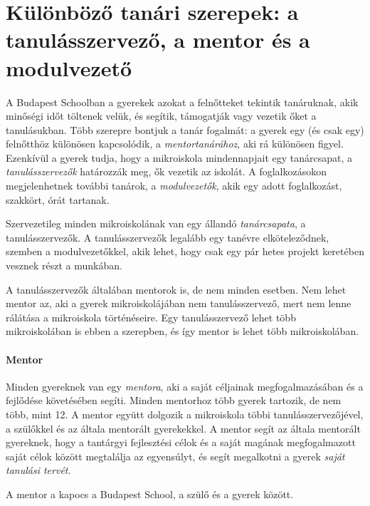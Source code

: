 \section{Különböző tanári szerepek: a tanulásszervező, a mentor és a
    modulvezető}
\label{sec:tanarok}

A Budapest Schoolban a gyerekek azokat a felnőtteket tekintik tanáruknak, akik
minőségi időt töltenek velük, és segítik, támogatják vagy vezetik őket a
tanulásukban. Több szerepre bontjuk a tanár fogalmát: a gyerek egy (és csak
egy) felnőtthöz különösen kapcsolódik, a \emph{mentortanárához}, aki rá
különösen figyel. Ezenkívül a gyerek tudja, hogy a mikroiskola mindennapjait
egy tanárcsapat, a \emph{tanulásszervezők} határozzák meg, ők vezetik az
iskolát.  A foglalkozásokon megjelenhetnek további tanárok, a \emph{modulvezetők},
akik egy adott foglalkozást, szakkört, órát tartanak.

Szervezetileg minden mikroiskolának van egy állandó \emph{tanárcsapata}, a
tanulásszervezők. A tanulásszervezők legalább egy tanévre elköteleződnek, szemben a
modulvezetőkkel, akik lehet, hogy csak egy pár hetes projekt keretében vesznek részt a
munkában.

A tanulásszervezők általában mentorok is, de nem minden esetben. Nem lehet
mentor az, aki a gyerek mikroiskolájában nem tanulásszervező, mert nem lenne
rálátása a mikroiskola történéseire. Egy tanulásszervező lehet több
mikroiskolában is ebben a szerepben, és így mentor is lehet több mikroiskolában.

\paragraph{Mentor}
Minden gyereknek van egy \emph{mentora}, aki a saját céljainak
megfogalmazásában és
a fejlődése követésében segíti. Minden mentorhoz több gyerek tartozik, de nem
több, mint 12. A mentor együtt dolgozik a mikroiskola többi tanulásszervezőjével, a
szülőkkel és az általa mentorált gyerekekkel. A mentor segít az általa
mentorált gyereknek, hogy a tantárgyi fejlesztési célok és
a
saját magának megfogalmazott saját célok között megtalálja  az egyensúlyt, és segít megalkotni a
gyerek \emph{saját
  tanulási tervét}.

A mentor a kapocs a Budapest School, a szülő és a gyerek között.

